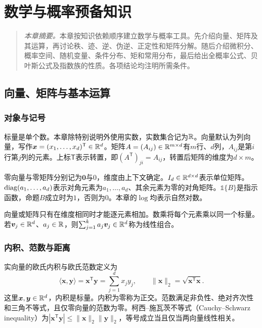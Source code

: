 ﻿\chapter{数学与概率预备知识}

\begin{quote}\small
\textit{本章摘要。}本章按知识依赖顺序建立数学与概率工具。先介绍向量、矩阵及其运算，再讨论秩、迹、逆、伪逆、正定性和矩阵分解。随后介绍微积分、概率空间、随机变量、条件分布、矩和常用分布，最后给出全概率公式、贝叶斯公式及指数族的性质。各项结论均注明所需条件。
\end{quote}

\section{向量、矩阵与基本运算}
\subsection{对象与记号}
标量是单个数。本章除特别说明外使用实数，实数集合记为$\mathbb{R}$。向量默认为列向量，写作$\bm x=(x_1,\ldots,x_d)^{\mathsf T}\in\mathbb{R}^d$。矩阵$A=(A_{ij})\in\mathbb{R}^{m\times d}$有$m$行、$d$列，$A_{ij}$是第$i$行第$j$列的元素。上标$\mathsf T$表示转置，即$(A^{\mathsf T})_{ji}=A_{ij}$，转置后矩阵的维度为$d\times m$。

零向量与零矩阵分别记为$\bm0$与$0$，维度由上下文确定。$I_d\in\mathbb{R}^{d\times d}$表示单位矩阵。$\operatorname{diag}(a_1,\ldots,a_d)$表示对角元素为$a_1,\ldots,a_d$、其余元素为零的对角矩阵。$\mathbb{1}\{B\}$是指示函数，命题$B$成立时为$1$，否则为$0$。本章的$\log$均表示自然对数。

向量或矩阵只有在维度相同时才能逐元素相加。数乘将每个元素乘以同一个标量。若$\bm v_j\in\mathbb{R}^d$、$a_j\in\mathbb{R}$，则$\sum_{j=1}^k a_j\bm v_j\in\mathbb{R}^d$称为线性组合。

\subsection{内积、范数与距离}
实向量的欧氏内积与欧氏范数定义为
\begin{equation}
 \langle\bm x,\bm y\rangle=\bm x^{\mathsf T}\bm y=\sum_{j=1}^d x_jy_j,
 \qquad \|\bm x\|_2=\sqrt{\bm x^{\mathsf T}\bm x}.
\end{equation}
这里$\bm x,\bm y\in\mathbb{R}^d$，内积是标量。内积为零称为正交。范数满足非负性、绝对齐次性和三角不等式，且仅零向量的范数为零。柯西--施瓦茨不等式（Cauchy--Schwarz inequality）为$|\bm x^{\mathsf T}\bm y|\leq\|\bm x\|_2\|\bm y\|_2$，等号成立当且仅当两向量线性相关。

